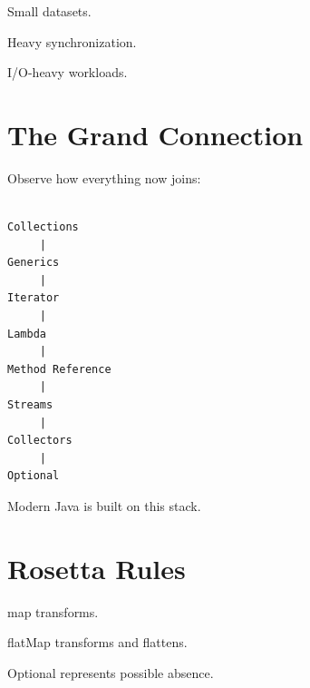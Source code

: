 \documentclass[11pt,a4paper]{book}
\begin{document}
Small datasets.


Heavy synchronization.


I/O-heavy workloads.


\section{The Grand Connection}

Observe how everything now joins:

\begin{verbatim}

Collections
     |
Generics
     |
Iterator
     |
Lambda
     |
Method Reference
     |
Streams
     |
Collectors
     |
Optional

\end{verbatim}


Modern Java is built on this stack.


\section{Rosetta Rules}

\begin{rosettarule}

map transforms.

\end{rosettarule}


\begin{rosettarule}

flatMap transforms and flattens.

\end{rosettarule}


\begin{rosettarule}

Optional represents possible absence.

\end{rosettarule}
\end{document}
